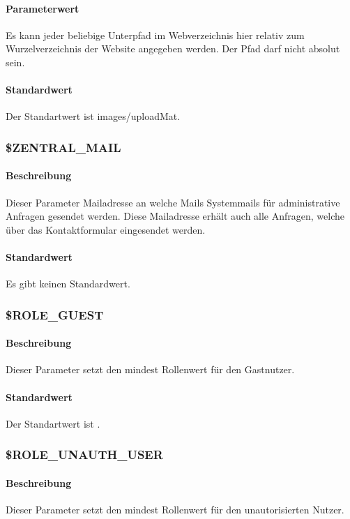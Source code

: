 \paragraph{Parameterwert}Es kann jeder beliebige Unterpfad im Webverzeichnis hier relativ zum Wurzelverzeichnis der Website angegeben werden. Der Pfad darf nicht absolut sein.
\paragraph{Standardwert}Der Standartwert ist {\glqq images/uploadMat\grqq}.

\subsubsection{\$ZENTRAL\_MAIL} \label{config:zentral-mail}
\paragraph{Beschreibung}Dieser Parameter Mailadresse an welche Mails Systemmails für administrative Anfragen gesendet werden. Diese Mailadresse erhält auch alle Anfragen, welche über das Kontaktformular eingesendet werden.
\paragraph{Standardwert}Es gibt keinen Standardwert.

\subsubsection{\$ROLE\_GUEST}
\paragraph{Beschreibung}Dieser Parameter setzt den mindest Rollenwert für den Gastnutzer.
\paragraph{Standardwert}Der Standartwert ist {\grqq}.

\subsubsection{\$ROLE\_UNAUTH\_USER}
\paragraph{Beschreibung}Dieser Parameter setzt den mindest Rollenwert für den unautorisierten Nutzer.
